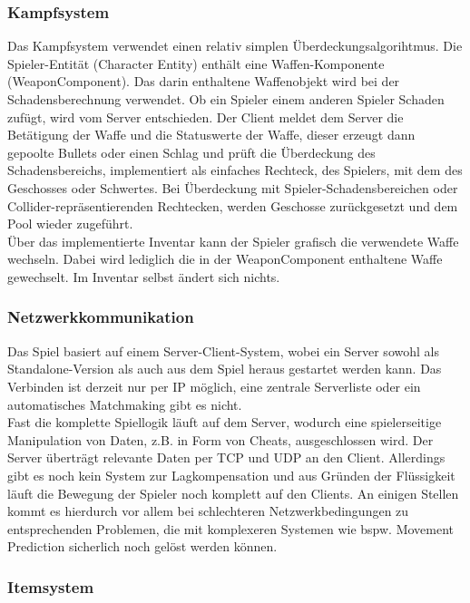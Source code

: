 \documentclass[10pt,a4paper,notitlepage]{scrreprt}
\begin{document}
		\subsubsection{Kampfsystem} 
		Das Kampfsystem verwendet einen relativ simplen Überdeckungsalgorihtmus. Die Spieler-Entität (Character Entity) enthält eine Waffen-Komponente (WeaponComponent). Das darin enthaltene Waffenobjekt wird bei der Schadensberechnung verwendet. Ob ein Spieler einem anderen Spieler Schaden zufügt, wird vom Server entschieden. Der Client meldet dem Server die Betätigung der Waffe und die Statuswerte der Waffe, dieser erzeugt dann gepoolte Bullets oder einen Schlag und prüft die Überdeckung des Schadensbereichs, implementiert als einfaches Rechteck, des Spielers, mit dem des Geschosses oder Schwertes. Bei Überdeckung mit Spieler-Schadensbereichen oder Collider-repräsentierenden Rechtecken, werden Geschosse zurückgesetzt und dem Pool wieder zugeführt.\\
		Über das implementierte Inventar kann der Spieler grafisch die verwendete Waffe wechseln. Dabei wird lediglich die in der WeaponComponent enthaltene Waffe gewechselt. Im Inventar selbst ändert sich nichts.\\
		
		
		\subsubsection{Netzwerkkommunikation}
		
		Das Spiel basiert auf einem Server-Client-System, wobei ein Server sowohl als Standalone-Version als auch aus dem Spiel heraus gestartet werden kann. Das Verbinden ist derzeit nur per IP möglich, eine zentrale Serverliste oder ein automatisches Matchmaking gibt es nicht.\\
		Fast die komplette Spiellogik läuft auf dem Server, wodurch eine spielerseitige Manipulation von Daten, z.B. in Form von Cheats, ausgeschlossen wird. Der Server überträgt relevante Daten per TCP und UDP an den Client. Allerdings gibt es noch kein System zur Lagkompensation und aus Gründen der Flüssigkeit läuft die Bewegung der Spieler noch komplett auf den Clients. An einigen Stellen kommt es hierdurch vor allem bei schlechteren Netzwerkbedingungen zu entsprechenden Problemen, die mit komplexeren Systemen wie bspw. Movement Prediction sicherlich noch gelöst werden können.\\
		
		\subsubsection{Itemsystem}
		
\end{document}
